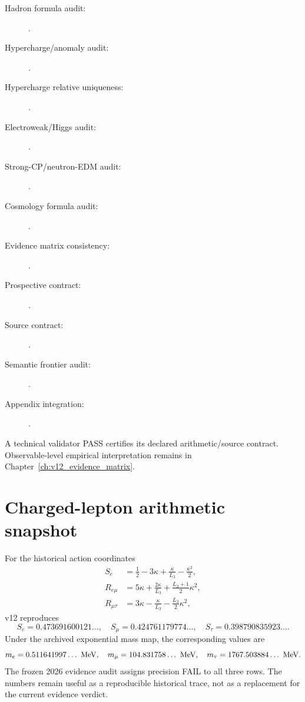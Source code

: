 \begin{description}
\item[Hadron formula audit:]
.
\item[Hypercharge/anomaly audit:]
.
\item[Hypercharge relative uniqueness:]
.
\item[Electroweak/Higgs audit:]
.
\item[Strong-CP/neutron-EDM audit:]
.
\item[Cosmology formula audit:]
.
\item[Evidence matrix consistency:]
.
\item[Prospective contract:]
.
\item[Source contract:]
.
\item[Semantic frontier audit:]
.
\item[Appendix integration:]
.
\end{description}

A technical validator PASS certifies its declared arithmetic/source contract.
Observable-level empirical interpretation remains in
Chapter~\ref{ch:v12_evidence_matrix}.

\section{Charged-lepton arithmetic snapshot}

For the historical action coordinates
\[
\begin{aligned}
S_e&=\frac12-3\kappa+\frac{\kappa}{L_3}-\frac{\kappa^2}{2},\\
R_{e\mu}&=5\kappa+\frac{2\kappa}{L_3}
+\frac{L_3+1}{2}\kappa^2,\\
R_{\mu\tau}&=3\kappa-\frac{\kappa}{L_3}
-\frac{L_3}{2}\kappa^2,
\end{aligned}
\]
v12 reproduces
\[
S_e=0.473691600121\ldots,\quad
S_\mu=0.424761179774\ldots,\quad
S_\tau=0.398790835923\ldots .
\]
Under the archived exponential mass map, the corresponding values are
\[
m_e=0.511641997\ldots\ {\rm MeV},
\quad
m_\mu=104.831758\ldots\ {\rm MeV},
\quad
m_\tau=1767.503884\ldots\ {\rm MeV}.
\]
The frozen 2026 evidence audit assigns precision FAIL to all three rows.  The
numbers remain useful as a reproducible historical trace, not as a replacement
for the current evidence verdict.

